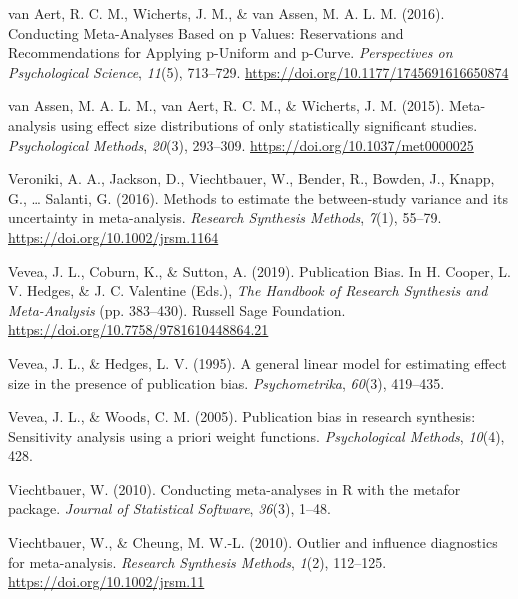 \documentclass[
  man,floatsintext]{apa6}
\newlength{\cslhangindent}
\newlength{\cslentryspacingunit} %
\newenvironment{CSLReferences}[2] %
 {%
  \setlength{\parindent}{0pt}
  \ifodd #1
  \let\oldpar\par
  \def\par{\hangindent=\cslhangindent\oldpar}
  \fi
  \setlength{\parskip}{#2\cslentryspacingunit}
 }%
 {}
\begin{document}
\begin{CSLReferences}{1}{0}
\leavevmode{}%
van Aert, R. C. M., Wicherts, J. M., \& van Assen, M. A. L. M. (2016). Conducting {Meta-Analyses Based} on p {Values}: {Reservations} and {Recommendations} for {Applying} p-{Uniform} and p-{Curve}. \emph{Perspectives on Psychological Science}, \emph{11}(5), 713--729. \url{https://doi.org/10.1177/1745691616650874}

\leavevmode{}%
van Assen, M. A. L. M., van Aert, R. C. M., \& Wicherts, J. M. (2015). Meta-analysis using effect size distributions of only statistically significant studies. \emph{Psychological Methods}, \emph{20}(3), 293--309. \url{https://doi.org/10.1037/met0000025}

\leavevmode{}%
Veroniki, A. A., Jackson, D., Viechtbauer, W., Bender, R., Bowden, J., Knapp, G., \ldots{} Salanti, G. (2016). Methods to estimate the between-study variance and its uncertainty in meta-analysis. \emph{Research Synthesis Methods}, \emph{7}(1), 55--79. \url{https://doi.org/10.1002/jrsm.1164}

\leavevmode{}%
Vevea, J. L., Coburn, K., \& Sutton, A. (2019). Publication {Bias}. In H. Cooper, L. V. Hedges, \& J. C. Valentine (Eds.), \emph{The {Handbook} of {Research Synthesis} and {Meta-Analysis}} (pp. 383--430). {Russell Sage Foundation}. \url{https://doi.org/10.7758/9781610448864.21}

\leavevmode{}%
Vevea, J. L., \& Hedges, L. V. (1995). A general linear model for estimating effect size in the presence of publication bias. \emph{Psychometrika}, \emph{60}(3), 419--435.

\leavevmode{}%
Vevea, J. L., \& Woods, C. M. (2005). Publication bias in research synthesis: Sensitivity analysis using a priori weight functions. \emph{Psychological Methods}, \emph{10}(4), 428.

\leavevmode{}%
Viechtbauer, W. (2010). Conducting meta-analyses in {R} with the {metafor} package. \emph{Journal of Statistical Software}, \emph{36}(3), 1--48.

\leavevmode{}%
Viechtbauer, W., \& Cheung, M. W.-L. (2010). Outlier and influence diagnostics for meta-analysis. \emph{Research Synthesis Methods}, \emph{1}(2), 112--125. \url{https://doi.org/10.1002/jrsm.11}


\end{CSLReferences}
\end{document}
